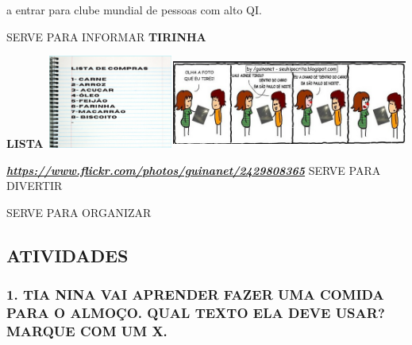 a entrar para clube mundial de pessoas com alto QI.

SERVE PARA INFORMAR \textbf{TIRINHA}

\textbf{LISTA}
\includegraphics[width=1.65625in,height=1.20625in]{media/image135.png}\includegraphics[width=3.04583in,height=1.19514in]{media/image136.png}

\href{https://www.flickr.com/photos/guinanet/2429808365}{\textbf{\emph{https://www.flickr.com/photos/guinanet/2429808365}}}
SERVE PARA DIVERTIR

SERVE PARA ORGANIZAR

\subsection{ATIVIDADES}\label{atividades-3}

\subsubsection{1. TIA NINA VAI APRENDER FAZER UMA COMIDA PARA O ALMOÇO.
QUAL TEXTO ELA DEVE USAR? MARQUE COM UM
X.}\label{tia-nina-vai-aprender-fazer-uma-comida-para-o-almouxe7o.-qual-texto-ela-deve-usar-marque-com-um-x.}

